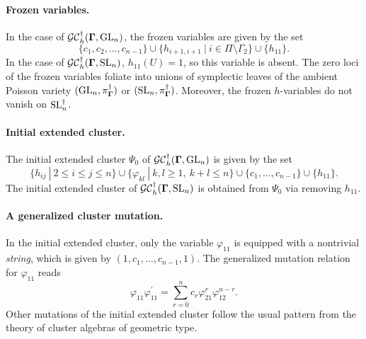 \paragraph{Frozen variables.} In the case of $\mathcal{GC}_h^{\dagger}(\mathbf{\Gamma},\operatorname{GL}_n)$, the frozen variables are given by the set
\begin{equation}
\{c_1,c_2,\ldots,c_{n-1}\} \cup \{h_{i+1,i+1} \ | \ i \in \Pi \setminus \Gamma_2\} \cup \{h_{11}\}.
\end{equation}
In the case of $\mathcal{GC}_h^{\dagger}(\mathbf{\Gamma},\operatorname{SL}_n)$, $h_{11}(U) = 1$, so this variable is absent. The zero loci of the frozen variables foliate into unions of symplectic leaves of the ambient Poisson variety $(\operatorname{GL}_n,\pi_{\mathbf{\Gamma}}^{\dagger})$ or $(\operatorname{SL}_n,\pi_{\mathbf{\Gamma}}^{\dagger})$. Moreover, the frozen $h$-variables do not vanish on $\operatorname{SL}_n^{\dagger}$.

\paragraph{Initial extended cluster.} The initial extended cluster $\Psi_0$ of $\mathcal{GC}_h^{\dagger}(\mathbf{\Gamma},\operatorname{GL}_n)$ is given by the set
\begin{equation}\label{eq:iniext}
    \{h_{ij} \ | \ 2 \leq i \leq j \leq n\} \cup \{\varphi_{kl} \ | \ k,l \geq 1, \ k+l\leq n\} \cup \{c_1,\ldots,c_{n-1}\}\cup\{h_{11}\}.
\end{equation}
The initial extended cluster of $\mathcal{GC}_h^{\dagger}(\mathbf{\Gamma},\operatorname{SL}_n)$ is obtained from $\Psi_0$ via removing $h_{11}$.

\paragraph{A generalized cluster mutation.} In the initial extended cluster, only the variable $\varphi_{11}$ is equipped with a nontrivial \emph{string}, which is given by $(1,c_1,\ldots,c_{n-1},1)$. The generalized mutation relation for $\varphi_{11}$ reads
\begin{equation}\label{eq:p11mut}
\varphi_{11} \varphi_{11}^{\prime} = \sum_{r=0}^n c_r \varphi_{21}^{r} \varphi_{12}^{n-r}.
\end{equation}
Other mutations of the initial extended cluster follow the usual pattern from the theory of cluster algebras of geometric type.